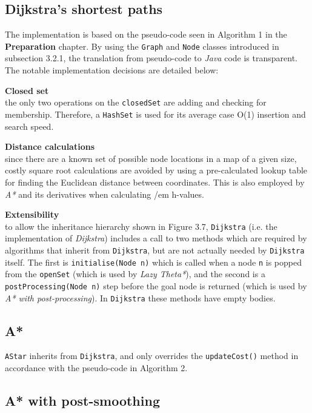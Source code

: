 \documentclass[12pt,notitlepage]{report}
\begin{document}
\subsection{Dijkstra's shortest paths}
The implementation is based on the pseudo-code seen in Algorithm 1 in the {\bfseries Preparation} chapter. By using the {\tt Graph} and {\tt Node} classes introduced in subsection 3.2.1, the translation from pseudo-code to {\em Java} code is transparent. The notable implementation decisions are detailed below:
\begin{description}
  \item {\bf Closed set}\\ \hfill
  the only two operations on the {\tt closedSet} are adding and checking for membership. Therefore, a {\tt HashSet} is used for its average case O(1) insertion and search speed.
  \item {\bf Distance calculations}\\ \hfill
  since there are a known set of possible node locations in a map of a given size, costly square root calculations are avoided by using a pre-calculated lookup table for finding the Euclidean distance between coordinates. This is also employed by {\em A*} and its derivatives when calculating {/em h-value}s.
  \item {\bf Extensibility} \\ \hfill
  to allow the inheritance hierarchy shown in Figure 3.7, {\tt Dijkstra} (i.e. the implementation of {\em Dijkstra}) includes a call to two methods which are required by algorithms that inherit from {\tt Dijkstra}, but are not actually needed by {\tt Dijkstra} itself. The first is {\tt initialise(Node n)} which is called when a node {\tt n} is popped from the {\tt openSet} (which is used by {\em Lazy Theta*}), and the second is a {\tt postProcessing(Node n)} step before the goal node is returned (which is used by {\em A* with post-processing}). In {\tt Dijkstra}  these methods have empty bodies.
  \end{description}

\subsection{A*}
{\tt AStar} inherits from {\tt Dijkstra}, and only overrides the {\tt updateCost()} method in accordance with the pseudo-code in Algorithm 2.

\subsection{A* with post-smoothing}
\end{document}
